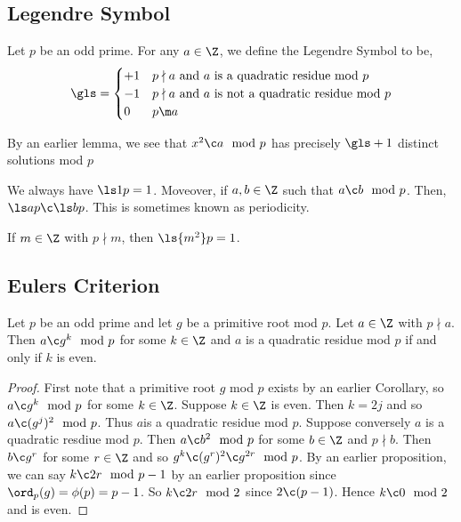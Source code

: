 \subsection{Legendre Symbol}
\begin{ndefi}
  Let $p$ be an odd prime. For any $a \in \Z$, we define the Legendre Symbol to be,
  $$ \gls = \begin{cases}
    +1 & \text{$p \nmid a$ and $a$ is a quadratic residue mod $p$} \\
    -1 & \text{$p \nmid a$ and $a$ is not a quadratic residue mod $p$}\\
    0 & \text{$p \m a$}
  \end{cases}$$
\end{ndefi}

\begin{remark}
   By an earlier lemma, we see that $x^2 \c a \mod p$ has precisely $\gls + 1$ distinct solutions mod $p$
\end{remark}

\begin{remark}
   We always have $\ls 1 p = 1$. Moveover, if $a, b \in \Z$ such that $a \c b \mod p$. Then, $\ls a p \c \ls b p$. This is sometimes known as periodicity.
\end{remark}

\begin{eg}
  If $m \in \Z$ with $p \nmid m$, then $\ls {m^2} p = 1$.
\end{eg}

\subsection{Eulers Criterion}

\begin{nlemma}
  Let $p$ be an odd prime and let $g$ be a primitive root mod $p$. Let $a \in \Z$ with $p \nmid a$. Then $a \c g^k \mod p$ for some $k \in \Z$ and $a$ is a quadratic residue mod $p$ if and only if $k$ is even.
\end{nlemma}
\begin{proof}
  First note that a primitive root $g$ mod $p$ exists by an earlier Corollary, so $a \c g^k \mod p$ for some $k \in \Z$. Suppose $k \in \Z$ is even. Then $k = 2j$ and so $a \c (g^j)^2 \mod p$. Thus $a$is a quadratic residue mod $p$. Suppose conversely $a$ is a quadratic resdiue mod $p$. Then $a \c b^2 \mod p$ for some $b \in \Z$ and $p \nmid b$.
  Then $b \c g^r$ for some $r \in \Z$ and so $g^k \c (g^r)^2 \c g^{2r} \mod p$. By an earlier proposition, we can say $k \c 2r \mod p-1$ by an earlier proposition since $\ord_p(g) = \phi(p) = p-1$. So $k \c 2r \mod 2$ since $2 \c (p-1)$. Hence $k \c 0 \mod 2$ and is even.
\end{proof}

